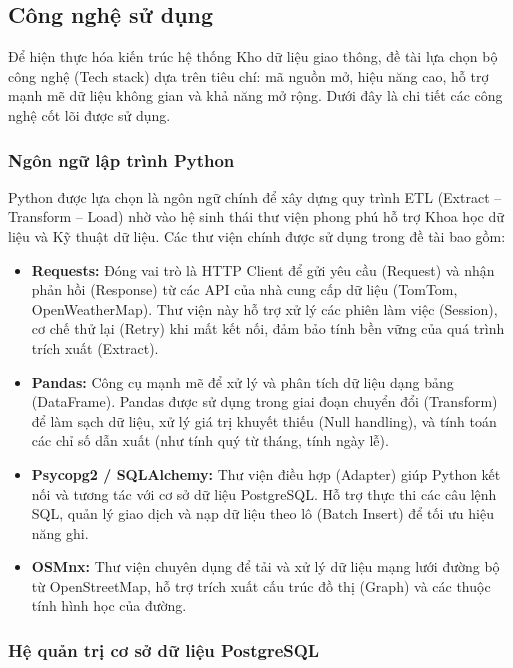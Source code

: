 \subsection{Công nghệ sử dụng}

Để hiện thực hóa kiến trúc hệ thống Kho dữ liệu giao thông, đề tài lựa chọn bộ công nghệ (Tech stack) dựa trên tiêu chí: mã nguồn mở, hiệu năng cao, hỗ trợ mạnh mẽ dữ liệu không gian và khả năng mở rộng. Dưới đây là chi tiết các công nghệ cốt lõi được sử dụng.

\subsubsection{Ngôn ngữ lập trình Python}

Python được lựa chọn là ngôn ngữ chính để xây dựng quy trình ETL (Extract – Transform – Load) nhờ vào hệ sinh thái thư viện phong phú hỗ trợ Khoa học dữ liệu và Kỹ thuật dữ liệu. Các thư viện chính được sử dụng trong đề tài bao gồm:
\begin{itemize}
    \item \textbf{Requests:} Đóng vai trò là HTTP Client để gửi yêu cầu (Request) và nhận phản hồi (Response) từ các API của nhà cung cấp dữ liệu (TomTom, OpenWeatherMap). Thư viện này hỗ trợ xử lý các phiên làm việc (Session), cơ chế thử lại (Retry) khi mất kết nối, đảm bảo tính bền vững của quá trình trích xuất (Extract).
    \item \textbf{Pandas:} Công cụ mạnh mẽ để xử lý và phân tích dữ liệu dạng bảng (DataFrame). Pandas được sử dụng trong giai đoạn chuyển đổi (Transform) để làm sạch dữ liệu, xử lý giá trị khuyết thiếu (Null handling), và tính toán các chỉ số dẫn xuất (như tính quý từ tháng, tính ngày lễ).
    \item \textbf{Psycopg2 / SQLAlchemy:} Thư viện điều hợp (Adapter) giúp Python kết nối và tương tác với cơ sở dữ liệu PostgreSQL. Hỗ trợ thực thi các câu lệnh SQL, quản lý giao dịch và nạp dữ liệu theo lô (Batch Insert) để tối ưu hiệu năng ghi.
    \item \textbf{OSMnx:} Thư viện chuyên dụng để tải và xử lý dữ liệu mạng lưới đường bộ từ OpenStreetMap, hỗ trợ trích xuất cấu trúc đồ thị (Graph) và các thuộc tính hình học của đường.
\end{itemize}

\subsubsection{Hệ quản trị cơ sở dữ liệu PostgreSQL}

